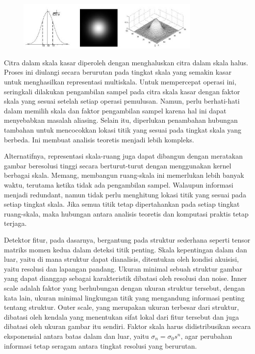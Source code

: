 \begin{figure}
  \centering{}
  \includegraphics[width=0.8\textwidth]{gambar/Uniform Gaussian kernel.jpg}
  \caption{}
\end{figure}

Citra dalam skala kasar diperoleh dengan menghaluskan citra dalam skala halus. 
Proses ini diulangi secara berurutan pada tingkat skala yang semakin kasar untuk menghasilkan representasi multiskala. 
Untuk mempercepat operasi ini, seringkali dilakukan pengambilan sampel pada citra skala kasar dengan faktor skala yang sesuai setelah setiap operasi pemulusan. 
Namun, perlu berhati-hati dalam memilih skala dan faktor pengambilan sampel karena hal ini dapat menyebabkan masalah aliasing. 
Selain itu, diperlukan penambahan hubungan tambahan untuk mencocokkan lokasi titik yang sesuai pada tingkat skala yang berbeda. 
Ini membuat analisis teoretis menjadi lebih kompleks.

Alternatifnya, representasi skala-ruang juga dapat dibangun dengan meratakan gambar beresolusi tinggi secara berturut-turut dengan menggunakan kernel berbagai skala. 
Memang, membangun ruang-skala ini memerlukan lebih banyak waktu, terutama ketika tidak ada pengambilan sampel. 
Walaupun informasi menjadi redundant, namun tidak perlu menghitung lokasi titik yang sesuai pada setiap tingkat skala. 
Jika semua titik tetap dipertahankan pada setiap tingkat ruang-skala, maka hubungan antara analisis teoretis dan komputasi praktis tetap terjaga.

Detektor fitur, pada dasarnya, bergantung pada struktur sederhana seperti tensor matriks momen kedua dalam deteksi titik penting. 
Skala kepentingan dalam dan luar, yaitu di mana struktur dapat dianalisis, ditentukan oleh kondisi akuisisi, yaitu resolusi dan lapangan pandang. 
Ukuran minimal sebuah struktur gambar yang dapat dianggap sebagai karakteristik dibatasi oleh resolusi dan noise. 
Inner scale adalah faktor yang berhubungan dengan ukuran struktur tersebut, dengan kata lain, ukuran minimal lingkungan titik yang mengandung informasi penting tentang struktur. Outer scale, yang merupakan ukuran terbesar dari struktur, dibatasi oleh kendala yang menentukan sifat lokal dari fitur tersebut dan juga dibatasi oleh ukuran gambar itu sendiri. 
Faktor skala harus didistribusikan secara eksponensial antara batas dalam dan luar, yaitu \(\sigma_{n} = \sigma_{0}s^{n}\), 
agar perubahan informasi tetap seragam antara tingkat resolusi yang berurutan. 


